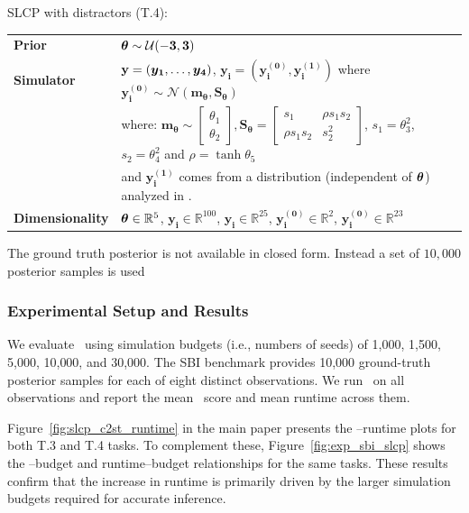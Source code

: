 SLCP with distractors (T.4):

\begin{tabular}{@{}ll@{}}
  \textbf{Prior} & $\boldsymbol{\theta} \sim \mathcal{U}(-\mathbf{3}, \mathbf{3})$ \\ [5pt]
  \textbf{Simulator} & $\mathbf{y} = (\boldsymbol{y_1}, \ldots, \boldsymbol{y_4})$, $\boldsymbol{y_i} = (\boldsymbol{y_i^{(0)}}, \boldsymbol{y_i^{(1)}})$ where $\boldsymbol{y_i^{(0)}} \sim \mathcal{N}(\boldsymbol{m_{\theta}}, \boldsymbol{S_{\theta}}) $ \\ [5pt]
                 & where: $\boldsymbol{m_{\theta}} \sim \begin{bmatrix}  \theta_1 \\ \theta_2 \end{bmatrix},
                   \boldsymbol{S_{\theta}} = \begin{bmatrix} s_1 & \rho s_1 s_2 \\ \rho s_1 s_2 & s_2^2  \end{bmatrix}$,
                   $s_1 = \theta_3^2$, $s_2 = \theta_4^2$ and $\rho = \tanh \theta_5$ \\ [10pt]
                 & and $\boldsymbol{y_i^{(1)}}$ comes from a distribution (independent of $\boldsymbol{\theta}$) analyzed in \citep{lueckmann2021benchmarking}. \\ [5pt]
  \textbf{Dimensionality} & $\boldsymbol{\theta} \in \mathbb{R}^{5}$, $\boldsymbol{y_i} \in \mathbb{R}^{100}$, $\boldsymbol{y_i} \in \mathbb{R}^{25}$, $\boldsymbol{y_i^{(0)}} \in \mathbb{R}^{2}$, $\boldsymbol{y_i^{(0)}} \in \mathbb{R}^{23}$ \\ [5pt]
\end{tabular}

The ground truth posterior is not available in closed form. Instead a set of $10{,}000$ posterior samples is used


\subsubsection{Experimental Setup and Results}

We evaluate \rromc~using simulation budgets (i.e., numbers of seeds) of 1{,}000, 1{,}500, 5{,}000, 10{,}000, and 30{,}000. 
The SBI benchmark provides 10{,}000 ground-truth posterior samples for each of eight distinct observations. 
We run \rromc~on all observations and report the mean \CtwoST~score and mean runtime across them.

Figure~\ref{fig:slcp_c2st_runtime} in the main paper presents the \CtwoST--runtime plots for both T.3 and T.4 tasks. 
To complement these, Figure~\ref{fig:exp_sbi_slcp} shows the \CtwoST--budget and runtime--budget relationships for the same tasks. 
These results confirm that the increase in runtime is primarily driven by the larger simulation budgets required for accurate inference.


